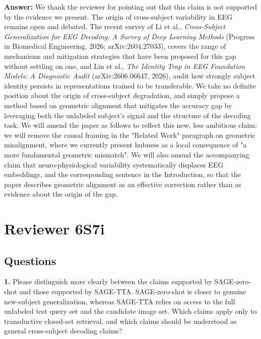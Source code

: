 \documentclass[11pt]{article}
\newcommand{\answer}[1]{{\textbf{Answer:} \color{blue} #1}}
\begin{document}
\answer{
We thank the reviewer for pointing out that this claim is not supported by the evidence we present. The
origin of cross-subject variability in EEG remains open and debated. The recent survey of Li et al.,
\emph{Cross-Subject Generalization for EEG Decoding: A Survey of Deep Learning Methods} (Progress in
Biomedical Engineering, 2026; arXiv:2604.27033), covers the range of mechanisms and mitigation
strategies that have been proposed for this gap without settling on one, and Lin et al., \emph{The Identity Trap in EEG Foundation Models: A Diagnostic Audit} (arXiv:2606.06647, 2026), audit how strongly subject identity persists in representations trained to be transferable. We take no definite position about the origin of cross-subject degradation, and simply propose a method based on geometric alignment that mitigates the accuracy gap by leveraging both the unlabeled subject's signal and the structure of the decoding task. We will amend the paper as follows to reflect this new, less ambitious claim: we will remove the causal framing in the "Related Work" paragraph on geometric misalignment, where we currently present hubness as a local consequence of "a more fundamental geometric mismatch". We will also amend the accompanying claim that neuro-physiological variability systematically displaces EEG embeddings, and the corresponding sentence in the Introduction, so that the paper describes geometric alignment as an effective correction rather than as evidence about the origin of the gap.
}

\section{Reviewer 6S7i}

\subsection{Questions}

\textbf{1.} Please distinguish more clearly between the claims supported by SAGE-zero-shot and those
supported by SAGE-TTA. SAGE-zero-shot is closer to genuine new-subject generalization, whereas
SAGE-TTA relies on access to the full unlabeled test query set and the candidate image set. Which
claims apply only to transductive closed-set retrieval, and which claims should be understood as
general cross-subject decoding claims?
\end{document}
